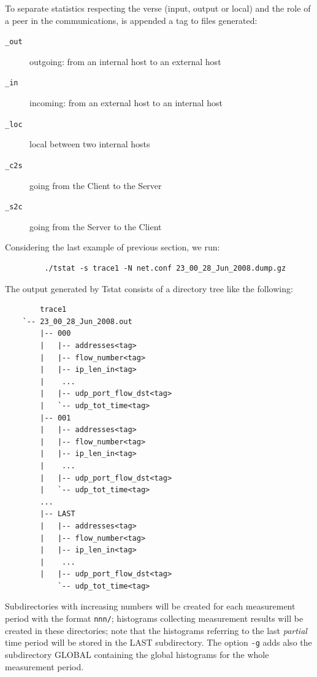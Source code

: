 \documentclass[11pt]{article}
\begin{document}
To separate statistics respecting the verse (input, output or local) and the role of a
peer in the communications, is appended a tag to files generated:

\begin{description}

\item[{\texttt{\_out}}] \mbox{}

outgoing: from an internal host to an external host


\item[{\texttt{\_in}}] \mbox{}

incoming: from an external host to an internal host


\item[{\texttt{\_loc}}] \mbox{}

local between two internal hosts


\item[{\texttt{\_c2s}}] \mbox{}

going from the Client to the Server


\item[{\texttt{\_s2c}}] \mbox{}

going from the Server to the Client

\end{description}


Considering the last example of previous section, we run:

\begin{small}\begin{verbatim}
         ./tstat -s trace1 -N net.conf 23_00_28_Jun_2008.dump.gz
\end{verbatim}\end{small} \noindent
The output generated by Tstat consists of a directory tree like the following:

\begin{small}\begin{verbatim}
        trace1
    `-- 23_00_28_Jun_2008.out
        |-- 000
        |   |-- addresses<tag>
        |   |-- flow_number<tag>
        |   |-- ip_len_in<tag>
        |    ...
        |   |-- udp_port_flow_dst<tag>
        |   `-- udp_tot_time<tag>
        |-- 001
        |   |-- addresses<tag>
        |   |-- flow_number<tag>
        |   |-- ip_len_in<tag>
        |    ...
        |   |-- udp_port_flow_dst<tag>
        |   `-- udp_tot_time<tag>
        ...
        |-- LAST
        |   |-- addresses<tag>
        |   |-- flow_number<tag>
        |   |-- ip_len_in<tag>
        |    ...
        |   |-- udp_port_flow_dst<tag>
            `-- udp_tot_time<tag>
\end{verbatim}\end{small} \noindent
Subdirectories with increasing numbers will be created for each measurement
period with the format \texttt{nnn/}; histograms collecting measurement results will
be created in these directories; note that the histograms referring to the last
\textit{partial} time period will be stored in the LAST subdirectory. The option \texttt{-g}
adds also the subdirectory GLOBAL containing the global histograms for the whole
measurement period.
\end{document}
